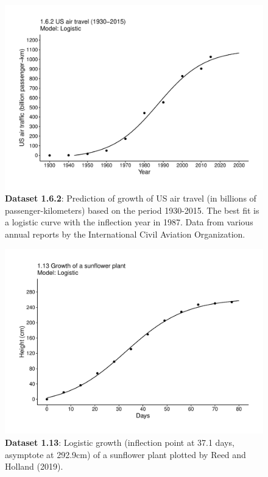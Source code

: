 \documentclass[aps,rmp,preprint,superscriptaddress,10pt,onecolumn]{article}
\begin{document}
\clearpage
\begin{figure}[h]
\includegraphics[width=\textwidth]{output/figs-ggplot/1.6.2.pdf}
\caption{\textbf{Dataset 1.6.2}: Prediction of growth of US air travel (in billions of passenger-kilometers) based on the period 1930-2015. The best fit is a logistic curve with the inflection year in 1987. Data from various annual reports by the International Civil Aviation Organization. }
\end{figure}
	
\clearpage
\begin{figure}[h]
\includegraphics[width=\textwidth]{output/figs-ggplot/1.13.pdf}
\caption{\textbf{Dataset 1.13}: Logistic growth (inflection point at 37.1 days, asymptote at 292.9cm) of a sunflower plant plotted by Reed and Holland (2019). }
\end{figure}
	
\end{document}
